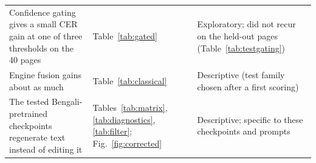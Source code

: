 \begin{table}[t]
\begin{tabular}{>{\raggedright\arraybackslash}p{7.4cm}>{\raggedright\arraybackslash}p{4.6cm}>{\raggedright\arraybackslash}p{5.2cm}}
Confidence gating gives a small CER gain at one of three thresholds on the 40 pages & Table~\ref{tab:gated} & Exploratory; did not recur on the held-out pages (Table~\ref{tab:testgating}) \\
Engine fusion gains about as much & Table~\ref{tab:classical} & Descriptive (test family chosen after a first scoring) \\
The tested Bengali-pretrained checkpoints regenerate text instead of editing it & Tables~\ref{tab:matrix}, \ref{tab:diagnostics}, \ref{tab:filter}; Fig.~\ref{fig:corrected} & Descriptive; specific to these checkpoints and prompts \\
\bottomrule
\end{tabular}
\end{table}
